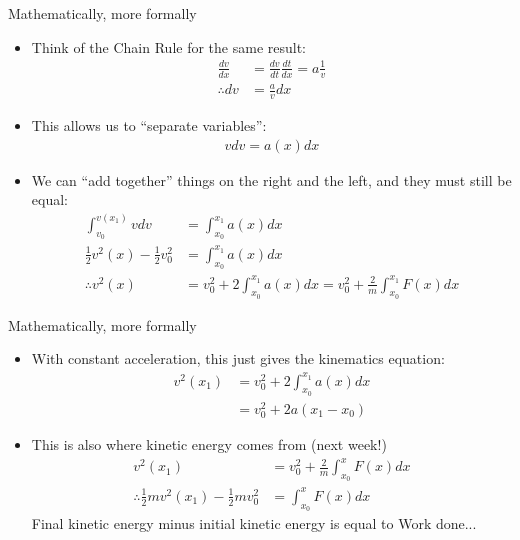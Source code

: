 \documentclass[aspectratio=169,
hyperref={colorlinks,urlcolor=blue}
]{beamer}
\begin{document}
\begin{frame}{Mathematically, more formally}
\begin{itemize}
\item<1-> Think of the Chain Rule for the same result:
\begin{align*}
\frac{dv}{dx}&=\frac{dv}{dt}\frac{dt}{dx}=a\frac{1}{v}\\
\therefore dv &=\frac{a}{v}dx
\end{align*}
\item<2-> This allows us to ``separate variables'':
\begin{align*}
vdv=a(x)dx
\end{align*}
\item<3-> We can ``add together'' things on the right and the left, and they must still be equal:
\begin{align*}
\int_{v_0}^{v(x_1)}vdv&=\int_{x_0}^{x_1} a(x)dx\\
\frac{1}{2}v^2(x)-\frac{1}{2}v_0^2&=\int_{x_0}^{x_1} a(x)dx\\
\therefore v^2(x)&=v_0^2+2\int_{x_0}^{x_1} a(x)dx=v_0^2+\frac{2}{m}\int_{x_0}^{x_1} F(x)dx
\end{align*}
\end{itemize}
\end{frame}


\begin{frame}{Mathematically, more formally}
\begin{itemize}
\item With constant acceleration, this just gives the kinematics equation:
\begin{align*}
v^2(x_1)&=v_0^2+2\int_{x_0}^{x_1} a(x)dx\\
&=v_0^2+2a(x_1-x_0)
\end{align*}
\item This is also where kinetic energy comes from (next week!)
\begin{align*}
v^2(x_1)&=v_0^2+\frac{2}{m}\int_{x_0}^x F(x)dx\\
\therefore \frac{1}{2}mv^2(x_1)-\frac{1}{2}mv_0^2&=\int_{x_0}^x F(x)dx
\end{align*}
Final kinetic energy minus initial kinetic energy is equal to Work done...
\end{itemize}
\end{frame}


\end{document}
